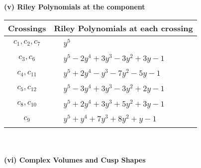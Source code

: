 \documentclass[1p]{elsarticle_modified}
\theoremstyle{definition}
\begin{document}
\newpage\renewcommand{\arraystretch}{1}
\flushleft \textbf{(v) Riley Polynomials at the component}\newline \\
\begin{tabular}{m{50pt}|m{274pt}}
Crossings & \hspace{64pt}Riley Polynomials at each crossing \\
\hline $$\begin{aligned}c_{1},c_{2},c_{7}\end{aligned}$$&$\begin{aligned}
&y^5
\end{aligned}$\\
\hline $$\begin{aligned}c_{3},c_{6}\end{aligned}$$&$\begin{aligned}
&y^5-2 y^4+3 y^3-3 y^2+3 y-1
\end{aligned}$\\
\hline $$\begin{aligned}c_{4},c_{11}\end{aligned}$$&$\begin{aligned}
&y^5+2 y^4- y^3-7 y^2-5 y-1
\end{aligned}$\\
\hline $$\begin{aligned}c_{5},c_{12}\end{aligned}$$&$\begin{aligned}
&y^5-3 y^4+3 y^3-3 y^2+2 y-1
\end{aligned}$\\
\hline $$\begin{aligned}c_{8},c_{10}\end{aligned}$$&$\begin{aligned}
&y^5+2 y^4+3 y^3+5 y^2+3 y-1
\end{aligned}$\\
\hline $$\begin{aligned}c_{9}\end{aligned}$$&$\begin{aligned}
&y^5+y^4+7 y^3+8 y^2+y-1
\end{aligned}$\\
\hline
\end{tabular}\\~\\
\newpage\flushleft \textbf{(vi) Complex Volumes and Cusp Shapes}
\end{document}

